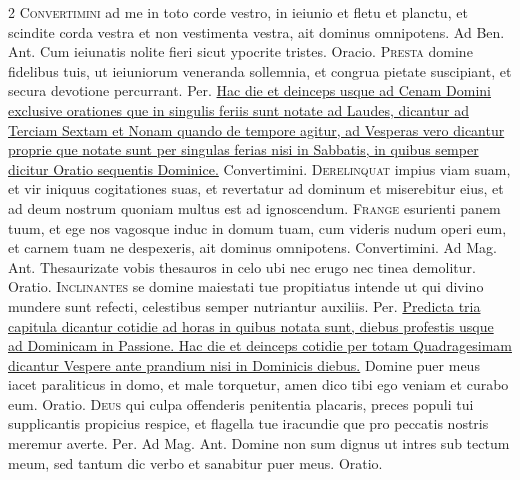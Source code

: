 \begin{multicols*}{2}
\lettrine[lines=2]{\zallmancaps \color{Red} C}{onvertimini} ad me in toto corde vestro, in ieiunio et fletu et planctu, et scindite corda vestra et non vestimenta vestra, ait dominus omnipotens. {\color{Red} Ad Ben. Ant.} Cum ieiunatis nolite fieri sicut ypocrite tristes. {\color{Red} Oracio.}
\lettrine[lines=2]{\zallmancaps \color{Blue} P}{resta} domine fidelibus tuis, ut ieiuniorum veneranda sollemnia, et congrua pietate suscipiant, et secura devotione percurrant. Per.
\newline \ul{Hac die et deinceps usque ad Cenam Domini exclusive orationes que in singulis feriis sunt notate ad Laudes, dicantur ad Terciam Sextam et Nonam quando de tempore agitur, ad Vesperas vero dicantur proprie que notate sunt per singulas ferias nisi in Sabbatis, in quibus semper dicitur Oratio sequentis Dominice.}
 Convertimini.
\lettrine[lines=2]{\zallmancaps \color{Red} D}{erelinquat} impius viam suam, et vir iniquus cogitationes suas, et revertatur ad dominum et miserebitur eius, et ad deum nostrum quoniam multus est ad ignoscendum.
\lettrine[lines=2]{\zallmancaps \color{Blue} F}{range} esurienti panem tuum, et ege nos vagosque induc in domum tuam, cum videris nudum operi eum, et carnem tuam ne despexeris, ait dominus omnipotens.
 Convertimini. {\color{Red} Ad Mag. Ant.} Thesaurizate vobis thesauros in celo ubi nec erugo nec tinea demolitur. {\color{Red} Oratio.}
\lettrine[lines=2]{\zallmancaps \color{Red} I}{nclinantes} se domine maiestati tue propitiatus intende ut qui divino mundere sunt refecti, celestibus semper nutriantur auxiliis. Per.
\newline \ul{Predicta tria capitula dicantur cotidie ad horas in quibus notata sunt, diebus profestis usque ad Dominicam in Passione. Hac die et deinceps cotidie per totam Quadragesimam dicantur Vespere ante prandium nisi in Dominicis diebus.}
 Domine puer meus iacet paraliticus in domo, et male torquetur, amen dico tibi ego veniam et curabo eum. {\color{Red} Oratio.}
\lettrine[lines=2]{\zallmancaps \color{Blue} D}{eus} qui culpa offenderis penitentia placaris, preces populi tui supplicantis propicius respice, et flagella tue iracundie que pro peccatis nostris meremur averte. Per. {\color{Red} Ad Mag. Ant.} Domine non sum dignus ut intres sub tectum meum, sed tantum dic verbo et sanabitur puer meus. {\color{Red} Oratio.}

\end{multicols*}
